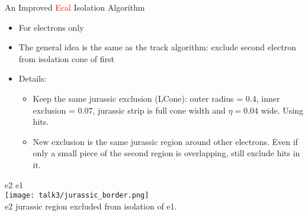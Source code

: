 \documentclass{beamer}
\begin{document}
\begin{frame}{An Improved \textcolor{red}{Ecal} Isolation Algorithm}
  \vspace{-0.2cm}
  \begin{itemize}
    \item For electrons only
    \item The general idea is the same as the track algorithm: exclude second electron from isolation cone of first
    \item Details: %
      \begin{itemize}
      \item Keep the same jurassic exclusion (LCone): outer radius = 0.4, inner exclusion = 0.07, jurassic strip is full cone width and $\eta = 0.04$ wide. Using hits.
      \item New exclusion is the same jurassic region around other electrons. Even if only a small piece of the second region is overlapping, still exclude hits in it.
      \end{itemize}
  \end{itemize}
  \begin{center}  
    \vspace{-0.2cm} \scriptsize{e2} \hspace{1.75cm} \scriptsize{e1}\\
    \vspace{-0.025cm} \texttt{[image: talk3/jurassic\_border.png]}\\
    \vspace{-0.2cm} e2 jurassic region excluded from isolation of e1.
  \end{center}
\end{frame}
\end{document}
